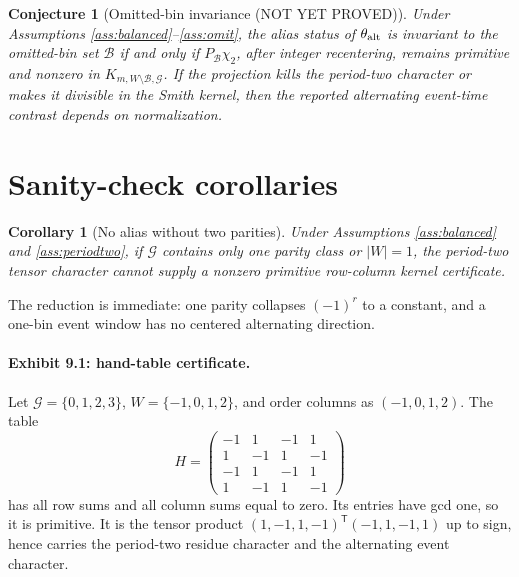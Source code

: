 \documentclass[11pt]{article}
\newcommand{\transpose}{\mathsf{T}}
\theoremstyle{definition}
\theoremstyle{plain}
\newtheorem{conjecture}{Conjecture}
\newtheorem{corollary}{Corollary}
\theoremstyle{remark}
\begin{document}
\begin{conjecture}[Omitted-bin invariance (NOT YET PROVED)]\label{conj:omit}
Under Assumptions \ref{ass:balanced}--\ref{ass:omit}, the alias status of \(\theta_{\rm alt}\) is invariant to the omitted-bin set \(\mathcal B\) if and only if \(P_{\mathcal B}\chi_2\), after integer recentering, remains primitive and nonzero in \(K_{m,W\setminus\mathcal B,\mathcal G}\). If the projection kills the period-two character or makes it divisible in the Smith kernel, then the reported alternating event-time contrast depends on normalization.
\end{conjecture}

\section{Sanity-check corollaries}
\begin{corollary}[No alias without two parities]\label{cor:no-parity}
Under Assumptions \ref{ass:balanced} and \ref{ass:periodtwo}, if \(\mathcal G\) contains only one parity class or \(|W|=1\), the period-two tensor character cannot supply a nonzero primitive row-column kernel certificate.
\end{corollary}
The reduction is immediate: one parity collapses \((-1)^r\) to a constant, and a one-bin event window has no centered alternating direction.

\paragraph{Exhibit 9.1: hand-table certificate.}
Let \(\mathcal G=\{0,1,2,3\}\), \(W=\{-1,0,1,2\}\), and order columns as \((-1,0,1,2)\). The table
\[
H=\begin{pmatrix}
-1&1&-1&1\\
1&-1&1&-1\\
-1&1&-1&1\\
1&-1&1&-1
\end{pmatrix}
\]
has all row sums and all column sums equal to zero. Its entries have gcd one, so it is primitive. It is the tensor product \((1,-1,1,-1)^\transpose(-1,1,-1,1)\) up to sign, hence carries the period-two residue character and the alternating event character.
\end{document}
